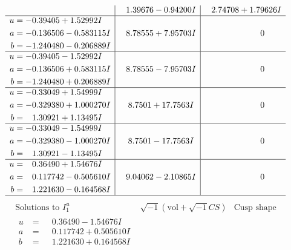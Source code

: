 \documentclass[1p]{elsarticle_modified}
\theoremstyle{definition}
\newcommand{\I}{\sqrt{-1}}
\begin{document}
$$\begin{array}{c|c|c}
 & \phantom{-}1.39676 - 0.94200 I & \phantom{-}2.74708 + 1.79626 I \\ \hline\begin{aligned}
u &= -0.39405 + 1.52992 I \\
a &= -0.136506 - 0.583115 I \\
b &= -1.240480 - 0.206889 I\end{aligned}
 & \phantom{-}8.78555 + 7.95703 I & \phantom{-0.000000 } 0 \\ \hline\begin{aligned}
u &= -0.39405 - 1.52992 I \\
a &= -0.136506 + 0.583115 I \\
b &= -1.240480 + 0.206889 I\end{aligned}
 & \phantom{-}8.78555 - 7.95703 I & \phantom{-0.000000 } 0 \\ \hline\begin{aligned}
u &= -0.33049 + 1.54999 I \\
a &= -0.329380 + 1.000270 I \\
b &= \phantom{-}1.30921 + 1.13495 I\end{aligned}
 & \phantom{-}8.7501 + 17.7563 I & \phantom{-0.000000 } 0 \\ \hline\begin{aligned}
u &= -0.33049 - 1.54999 I \\
a &= -0.329380 - 1.000270 I \\
b &= \phantom{-}1.30921 - 1.13495 I\end{aligned}
 & \phantom{-}8.7501 - 17.7563 I & \phantom{-0.000000 } 0 \\ \hline\begin{aligned}
u &= \phantom{-}0.36490 + 1.54676 I \\
a &= \phantom{-}0.117742 - 0.505610 I \\
b &= \phantom{-}1.221630 - 0.164568 I\end{aligned}
 & \phantom{-}9.04062 - 2.10865 I & \phantom{-0.000000 } 0\\
 \hline 
 \end{array}$$\newpage$$\begin{array}{c|c|c}  
\text{Solutions to }I^u_{1}& \I (\text{vol} + \sqrt{-1}CS) & \text{Cusp shape}\\
 \hline 
\begin{aligned}
u &= \phantom{-}0.36490 - 1.54676 I \\
a &= \phantom{-}0.117742 + 0.505610 I \\
b &= \phantom{-}1.221630 + 0.164568 I\end{aligned}

\end{array}$$
\end{document}
